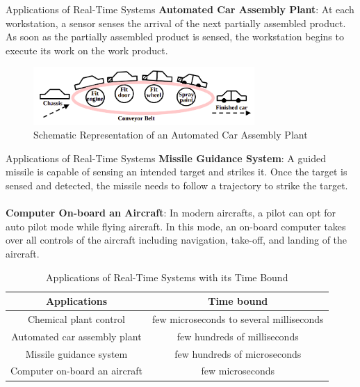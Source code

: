 \documentclass{beamer}
\begin{document}
\begin{frame}{Applications of Real-Time Systems}
\textbf{Automated Car Assembly Plant}: At each workstation,
a sensor senses the arrival of the next partially assembled product. As soon as the partially assembled product is sensed, the workstation begins to execute its work on the work product.
\begin{figure}[h]
    \centering
    \includegraphics[width=0.75\textwidth]{images/car-assembly.png}
    \caption{Schematic Representation of an Automated Car Assembly Plant}
\end{figure}
\end{frame}

\begin{frame}{Applications of Real-Time Systems}
\textbf{Missile Guidance System}: A guided missile is capable of sensing an intended target and strikes it. Once the target is sensed
and detected, the missile needs to follow a trajectory to strike the target. \\~\\
\textbf{Computer On-board an Aircraft}: In modern aircrafts, a pilot can opt for auto pilot mode while flying aircraft. In this mode, an on-board computer takes over all controls of the aircraft including navigation, take-off, and landing of the aircraft. 
\begin{table}
\centering
\begin{tabular}{|c|c|}
 \hline
 \textbf{Applications} & \textbf{Time bound} \\
 \hline \hline
 Chemical plant control & few microseconds to several milliseconds \\ 
 \hline
 Automated car assembly plant & few hundreds of milliseconds\\ 
 \hline
 Missile guidance system & few hundreds of microseconds\\ 
 \hline
 Computer on-board an aircraft & few microseconds \\
 \hline
\end{tabular}
\caption{Applications of Real-Time Systems with its Time Bound}
\end{table}
\end{frame}
\end{document}
